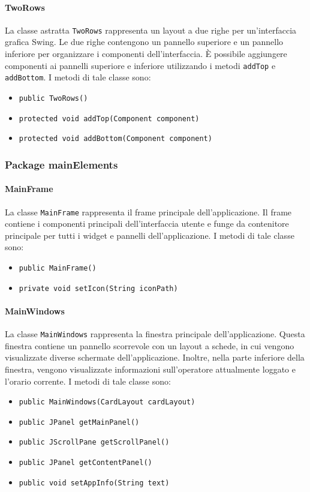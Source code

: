 \paragraph{TwoRows}
La classe astratta \texttt{TwoRows} rappresenta un layout a due righe per un'interfaccia grafica Swing.
Le due righe contengono un pannello superiore e un pannello inferiore per organizzare i componenti dell'interfaccia.
È possibile aggiungere componenti ai pannelli superiore e inferiore utilizzando i metodi \texttt{addTop} e \texttt{addBottom}.
I metodi di tale classe sono:
\begin{itemize}
    \item \texttt{public TwoRows()}
    \item \texttt{protected void addTop(Component component)}
    \item \texttt{protected void addBottom(Component component)}
\end{itemize}

\subsubsection {Package mainElements}

\paragraph{MainFrame}

La classe \texttt{MainFrame} rappresenta il frame principale dell'applicazione.
Il frame contiene i componenti principali dell'interfaccia utente e funge da contenitore principale per tutti i widget e pannelli dell'applicazione.
I metodi di tale classe sono:
\begin{itemize}
    \item \texttt{public MainFrame()}
    \item \texttt{private void setIcon(String iconPath)}
\end{itemize}

\paragraph{MainWindows}

La classe \texttt{MainWindows} rappresenta la finestra principale dell'applicazione.
Questa finestra contiene un pannello scorrevole con un layout a schede, in cui vengono visualizzate diverse schermate dell'applicazione. 
Inoltre, nella parte inferiore della finestra, vengono visualizzate informazioni sull'operatore attualmente loggato e l'orario corrente.
I metodi di tale classe sono:
\begin{itemize}
    \item \texttt{public MainWindows(CardLayout cardLayout)}
    \item \texttt{public JPanel getMainPanel()}
    \item \texttt{public JScrollPane getScrollPanel()}
    \item \texttt{public JPanel getContentPanel()}
    \item \texttt{public void setAppInfo(String text)}
\end{itemize}

